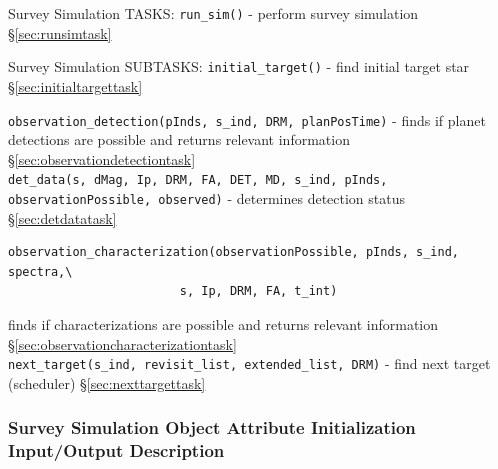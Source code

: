 \documentclass[cleanfoot]{asme2ej}
\begin{document}
Survey Simulation TASKS: 
\verb+run_sim()+ - perform survey simulation \S\ref{sec:runsimtask}

Survey Simulation SUBTASKS:
\verb+initial_target()+ - find initial target star \S\ref{sec:initialtargettask}

\verb+observation_detection(pInds, s_ind, DRM, planPosTime)+ - finds if planet detections are possible and returns relevant information \S\ref{sec:observationdetectiontask}\\
\verb+det_data(s, dMag, Ip, DRM, FA, DET, MD, s_ind, pInds, observationPossible, observed)+ - determines detection status \S\ref{sec:detdatatask}
\begin{verbatim}
observation_characterization(observationPossible, pInds, s_ind, spectra,\
	 					s, Ip, DRM, FA, t_int)
\end{verbatim} 
finds if characterizations are possible and returns relevant information \S\ref{sec:observationcharacterizationtask}\\
\verb+next_target(s_ind, revisit_list, extended_list, DRM)+ - find next target (scheduler) \S\ref{sec:nexttargettask}

\subsubsection{Survey Simulation Object Attribute Initialization Input/Output Description}
\end{document}
